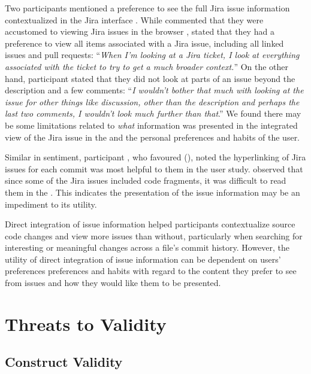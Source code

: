 Two participants mentioned a preference to see the full Jira issue information contextualized in the Jira interface .
While  commented that they were accustomed to viewing Jira issues in the browser ,
 stated that they had a preference to view all items associated with a Jira issue, including all linked issues and pull requests:
``\textit{When I’m looking at a Jira ticket, I look at everything associated with the ticket to try to get a much broader context.}''
On the other hand,
participant  stated that they did not look at parts of an issue beyond the description and a few comments:
``\textit{I wouldn’t bother that much with looking at the issue for other things like discussion, other than the description and perhaps the last two comments, 
I wouldn’t look much further than that}.''
We found there may be some limitations related to \emph{what} information was presented in the integrated view of the Jira issue in the 
and the personal preferences and habits of the user.

Similar in sentiment, participant , who favoured (), noted the hyperlinking of Jira issues for each commit
was most helpful to them in the user study.
 observed that since some of the Jira issues included code fragments, it was difficult to read them in the .
This indicates the presentation of the issue information may be an impediment to its utility.

\begin{summary}[RQ3]
  Direct integration of issue information helped participants contextualize source code changes and view more issues than without,
  particularly when searching for interesting or meaningful changes across a file's commit history.
  However, the utility of direct integration of issue information can be dependent on users' preferences preferences and habits 
  with regard to the content they prefer to see from issues and how they would like them to be presented.
\end{summary}


\section{Threats to Validity}

\subsection{Construct Validity}


